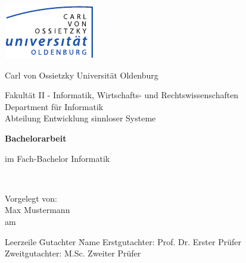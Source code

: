\begin{titlepage}
  \begin{center}
    \includegraphics[scale=1.5]{media/Uniol_kompakt_cmyk.pdf}\\
    \vspace*{0.5cm}
    \begin{LARGE}
      Carl von Ossietzky Universität Oldenburg \\   
    \end{LARGE}
    \vspace*{0.25cm}
    Fakultät II - Informatik, Wirtschafts- und Rechtswissenschaften \\
    Department für Informatik \\
    Abteilung Entwicklung sinnloser Systeme \\
    \vspace*{2.0cm}
    \begin{LARGE}
      \textbf{Bachelorarbeit} \\ 
    \end{LARGE}
    \begin{Large}
    	im Fach-Bachelor Informatik \\
    \end{Large}
    \vspace*{1.5cm}
    \begin{Large}
      \ThesisTitle \\
    \end{Large}
    \vspace*{2.0cm}
    Vorgelegt von: \\
    Max Mustermann \\
    am \ThesisDate \\
    \vspace*{2.5cm}
    \begin{tabbing}
      Leerzeile \= Gutachter \qquad \quad \= Name \kill
      \>  Erstgutachter:   \>  Prof. Dr. Erster Prüfer \\
      \>  Zweitgutachter:  \>  M.Sc. Zweiter Prüfer \\
    \end{tabbing}
  \end{center}
\end{titlepage}
